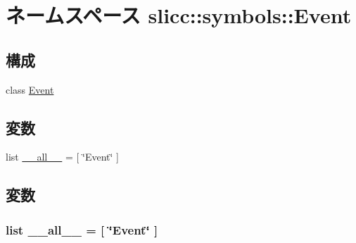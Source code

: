 \hypertarget{namespaceslicc_1_1symbols_1_1Event}{
\section{ネームスペース slicc::symbols::Event}
\label{namespaceslicc_1_1symbols_1_1Event}
}
\subsection*{構成}
\begin{DoxyCompactItemize}
\item 
class \hyperlink{classslicc_1_1symbols_1_1Event_1_1Event}{Event}
\end{DoxyCompactItemize}
\subsection*{変数}
\begin{DoxyCompactItemize}
\item 
list \hyperlink{namespaceslicc_1_1symbols_1_1Event_aa4a022e6ddacd362b83964da5cc5d044}{\_\-\_\-all\_\-\_\-} = \mbox{[} \char`\"{}Event\char`\"{} \mbox{]}
\end{DoxyCompactItemize}


\subsection{変数}
\hypertarget{namespaceslicc_1_1symbols_1_1Event_aa4a022e6ddacd362b83964da5cc5d044}{
\subsubsection[{\_\-\_\-all\_\-\_\-}]{\setlength{\rightskip}{0pt plus 5cm}list {\bf \_\-\_\-all\_\-\_\-} = \mbox{[} \char`\"{}Event\char`\"{} \mbox{]}}}
\label{namespaceslicc_1_1symbols_1_1Event_aa4a022e6ddacd362b83964da5cc5d044}
